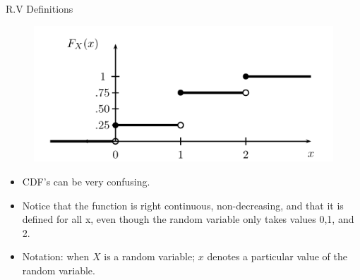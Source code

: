 \documentclass[handout]{beamer}
\begin{document}
\begin{frame}{R.V Definitions}
\scriptsize{

\begin{figure}[h!]
	\centering
	\includegraphics[scale=0.4]{pics/cdf_coin.png}
\end{figure}


\begin{itemize}
 \item CDF's can be very confusing. 
 \item Notice that the function is right continuous, non-decreasing, and that it is defined for all x, even though the random variable only takes values 0,1, and 2.
 \item Notation: when $X$ is a random variable; $x$ denotes a particular value of the random variable.
 
\end{itemize}


} 
\end{frame}
\end{document}
